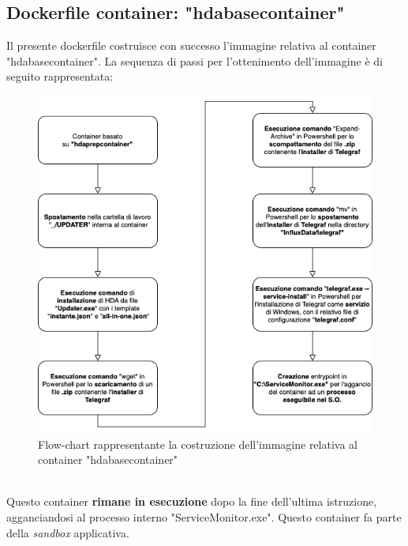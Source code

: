 \subsection{Dockerfile container: "hdabasecontainer"}
Il presente dockerfile costruisce con successo l'immagine relativa al container "hdabasecontainer". La sequenza di passi per l'ottenimento dell'immagine è di seguito rappresentata:
\begin{figure}[!h]     
\centering 
    \includegraphics[width=0.7\columnwidth]{immagini/flowchart/flowchart_hdabasecontainer} 
    \caption{Flow-chart rappresentante la costruzione dell'immagine relativa al container "hdabasecontainer"}
\end{figure} \\
Questo container \textbf{rimane in esecuzione} dopo la fine dell'ultima istruzione, agganciandosi al processo interno "ServiceMonitor.exe". Questo container fa parte della \textit{sandbox} applicativa.
\newpage

